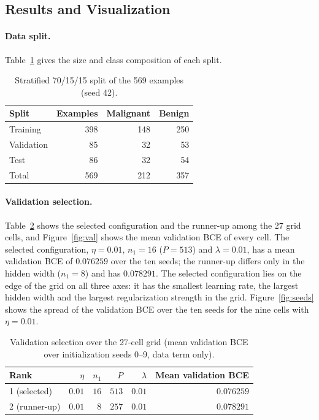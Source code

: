 \subsection{Results and Visualization}
\label{sec:results}

\paragraph{Data split.}
Table~\ref{tab:split} gives the size and class composition of each split.

\begin{table}[htbp]
  \centering
  \caption{Stratified 70/15/15 split of the 569 examples (seed 42).}
  \label{tab:split}
  \begin{tabular}{@{}lrrr@{}}
    \toprule
    Split & Examples & Malignant & Benign \\
    \midrule
    Training   & 398 & 148 & 250 \\
    Validation &  85 &  32 &  53 \\
    Test       &  86 &  32 &  54 \\
    \midrule
    Total      & 569 & 212 & 357 \\
    \bottomrule
  \end{tabular}
\end{table}

\paragraph{Validation selection.}
Table~\ref{tab:selection} shows the selected configuration and the runner-up among the 27 grid cells, and Figure~\ref{fig:val} shows the mean validation BCE of every cell. The selected configuration, $\eta=0.01$, $n_1=16$ ($P=513$) and $\lambda=0.01$, has a mean validation BCE of $0.076259$ over the ten seeds; the runner-up differs only in the hidden width ($n_1=8$) and has $0.078291$. The selected configuration lies on the edge of the grid on all three axes: it has the smallest learning rate, the largest hidden width and the largest regularization strength in the grid. Figure~\ref{fig:seeds} shows the spread of the validation BCE over the ten seeds for the nine cells with $\eta=0.01$.

\begin{table}[htbp]
  \centering
  \caption{Validation selection over the 27-cell grid (mean validation BCE over initialization seeds 0--9, data term only).}
  \label{tab:selection}
  \begin{tabular}{@{}lrrrrr@{}}
    \toprule
    Rank & $\eta$ & $n_1$ & $P$ & $\lambda$ & Mean validation BCE \\
    \midrule
    1 (selected) & $0.01$ & $16$ & $513$ & $0.01$ & $0.076259$ \\
    2 (runner-up) & $0.01$ & $8$ & $257$ & $0.01$ & $0.078291$ \\
    \bottomrule
  \end{tabular}
\end{table}

